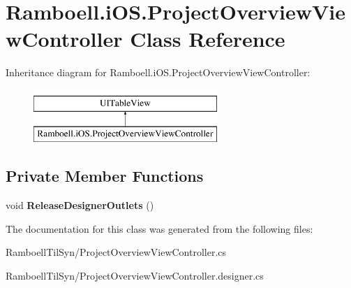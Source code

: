 \hypertarget{class_ramboell_1_1i_o_s_1_1_project_overview_view_controller}{}\section{Ramboell.\+i\+O\+S.\+Project\+Overview\+View\+Controller Class Reference}
\label{class_ramboell_1_1i_o_s_1_1_project_overview_view_controller}
Inheritance diagram for Ramboell.\+i\+O\+S.\+Project\+Overview\+View\+Controller\+:\begin{figure}[H]
\begin{center}
\leavevmode
\includegraphics[height=2.000000cm]{class_ramboell_1_1i_o_s_1_1_project_overview_view_controller}
\end{center}
\end{figure}
\subsection*{Private Member Functions}
\begin{DoxyCompactItemize}
\item 
\mbox{\label{class_ramboell_1_1i_o_s_1_1_project_overview_view_controller_a4d8d54b447075d9c398a34a33eafb91d}} 
void {\bfseries Release\+Designer\+Outlets} ()
\end{DoxyCompactItemize}


The documentation for this class was generated from the following files\+:\begin{DoxyCompactItemize}
\item 
Ramboell\+Til\+Syn/Project\+Overview\+View\+Controller.\+cs\item 
Ramboell\+Til\+Syn/Project\+Overview\+View\+Controller.\+designer.\+cs\end{DoxyCompactItemize}
